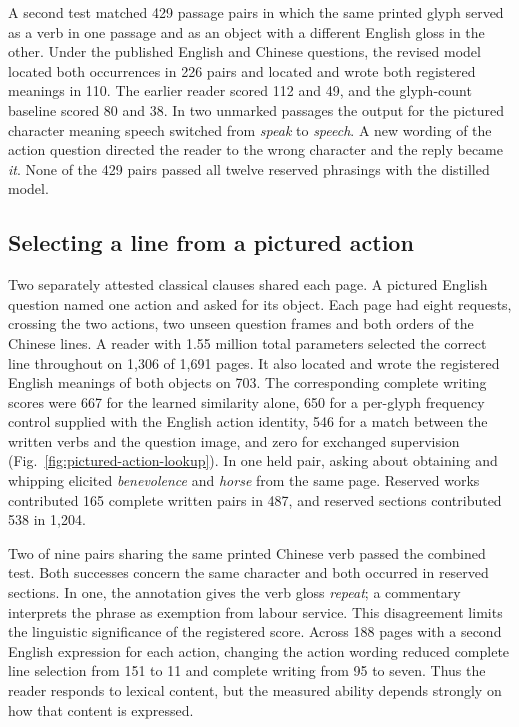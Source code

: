 \documentclass[12pt,a4paper]{article}
\providecommand{\DIFadd}[1]{{\protect\color{blue} \sf #1}} %
\begin{document}
\DIFadd{A second test matched 429 passage pairs in which the same printed glyph served as a verb in one passage and as an object with a different English gloss in the other. Under the published English and Chinese questions, the revised model located both occurrences in 226 pairs and located and wrote both registered meanings in 110. The earlier reader scored 112 and 49, and the glyph-count baseline scored 80 and 38. In two unmarked passages the output for the pictured character meaning speech switched from \textit{speak} to \textit{speech}. A new wording of the action question directed the reader to the wrong character and the reply became \textit{it}. None of the 429 pairs passed all twelve reserved phrasings with the distilled model.
}

\subsection*{\DIFadd{Selecting a line from a pictured action}}
\DIFadd{Two separately attested classical clauses shared each page. A pictured English question named one action and asked for its object. Each page had eight requests, crossing the two actions, two unseen question frames and both orders of the Chinese lines. A reader with 1.55 million total parameters selected the correct line throughout on 1,306 of 1,691 pages. It also located and wrote the registered English meanings of both objects on 703. The corresponding complete writing scores were 667 for the learned similarity alone, 650 for a per-glyph frequency control supplied with the English action identity, 546 for a match between the written verbs and the question image, and zero for exchanged supervision (Fig.~\ref{fig:pictured-action-lookup}). In one held pair, asking about obtaining and whipping elicited \textit{benevolence} and \textit{horse} from the same page. Reserved works contributed 165 complete written pairs in 487, and reserved sections contributed 538 in 1,204.
}

\DIFadd{Two of nine pairs sharing the same printed Chinese verb passed the combined test. Both successes concern the same character and both occurred in reserved sections. In one, the annotation gives the verb gloss \textit{repeat}; a commentary interprets the phrase as exemption from labour service. This disagreement limits the linguistic significance of the registered score. Across 188 pages with a second English expression for each action, changing the action wording reduced complete line selection from 151 to 11 and complete writing from 95 to seven. Thus the reader responds to lexical content, but the measured ability depends strongly on how that content is expressed.
}
\end{document}
